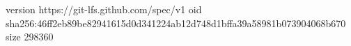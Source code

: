 version https://git-lfs.github.com/spec/v1
oid sha256:46ff2eb89be82941615d0d341224ab12d748d1bffa39a58981b073904068b670
size 298360
